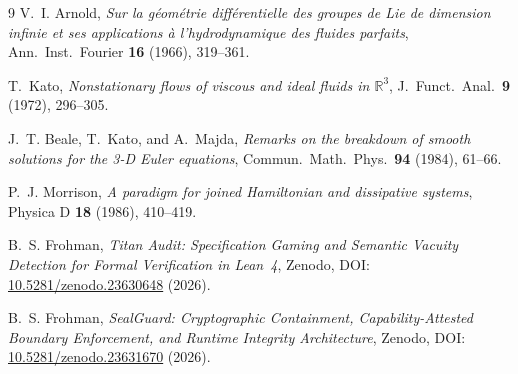 \documentclass[11pt,a4paper]{article}
\theoremstyle{definition}
\begin{document}
\begin{thebibliography}{9}
V.~I. Arnold, \emph{Sur la g\'eom\'etrie diff\'erentielle des groupes de Lie de dimension infinie et ses applications \`a l'hydrodynamique des fluides parfaits}, Ann.\ Inst.\ Fourier \textbf{16} (1966), 319--361.

T.~Kato, \emph{Nonstationary flows of viscous and ideal fluids in $\mathbb{R}^3$}, J.\ Funct.\ Anal.\ \textbf{9} (1972), 296--305.

J.~T. Beale, T.~Kato, and A.~Majda, \emph{Remarks on the breakdown of smooth solutions for the 3-D Euler equations}, Commun.\ Math.\ Phys.\ \textbf{94} (1984), 61--66.

P.~J. Morrison, \emph{A paradigm for joined Hamiltonian and dissipative systems}, Physica D \textbf{18} (1986), 410--419.

B.~S. Frohman, \emph{Titan Audit: Specification Gaming and Semantic Vacuity Detection for Formal Verification in Lean~4}, Zenodo, DOI: \href{https://doi.org/10.5281/zenodo.23630648}{10.5281/zenodo.23630648} (2026).

B.~S. Frohman, \emph{SealGuard: Cryptographic Containment, Capability-Attested Boundary Enforcement, and Runtime Integrity Architecture}, Zenodo, DOI: \href{https://doi.org/10.5281/zenodo.23631670}{10.5281/zenodo.23631670} (2026).
\end{thebibliography}
\end{document}
